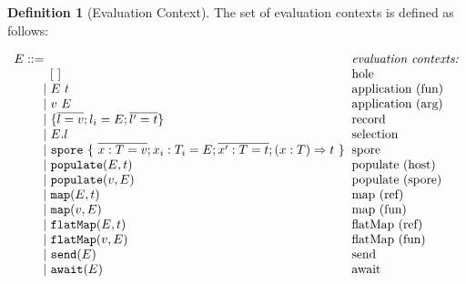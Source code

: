 \documentclass{article}
\theoremstyle{definition}
\newtheorem{defn}{Definition}[section]
\newcommand{\gap}{\quad\quad}
\newcommand{\ba}{\begin{array}}
\newcommand{\ea}{\end{array}}
\newcommand{\seq}[1]{\overline{#1}}
\begin{document}
\begin{defn}[Evaluation Context]
  The set of evaluation contexts is defined as follows:
  
$\ba[t]{l@{\hspace{2mm}}l}
E ::=                                                                                                     & \mbox{\it{evaluation contexts:}} \\
\gap \:\:\:\: [~]                                                                                         & \mbox{hole} \\
\gap ~|~  E~t                                                                                             & \mbox{application (fun)} \\
\gap ~|~  v~E                                                                                             & \mbox{application (arg)} \\
\gap ~|~  \{ \seq{l = v} ; l_i = E ; \seq{l' = t} \}                                                      & \mbox{record} \\
\gap ~|~  E.l                                                                                             & \mbox{selection} \\
\gap ~|~  \texttt{spore}~\{~\seq{x : T = v} ; x_i : T_i = E ; \seq{x' : T = t} ; (x: T) \Rightarrow t~\}  & \mbox{spore} \\
\gap ~|~  \texttt{populate}(E, t)                                                                         & \mbox{populate (host)} \\
\gap ~|~  \texttt{populate}(v, E)                                                                         & \mbox{populate (spore)} \\
\gap ~|~  \texttt{map}(E, t)                                                                              & \mbox{map (ref)} \\
\gap ~|~  \texttt{map}(v, E)                                                                              & \mbox{map (fun)} \\
\gap ~|~  \texttt{flatMap}(E, t)                                                                          & \mbox{flatMap (ref)} \\
\gap ~|~  \texttt{flatMap}(v, E)                                                                          & \mbox{flatMap (fun)} \\
\gap ~|~  \texttt{send}(E)                                                                                & \mbox{send} \\
\gap ~|~  \texttt{await}(E)                                                                               & \mbox{await} \\
\ea$ 
\end{defn}
\end{document}

